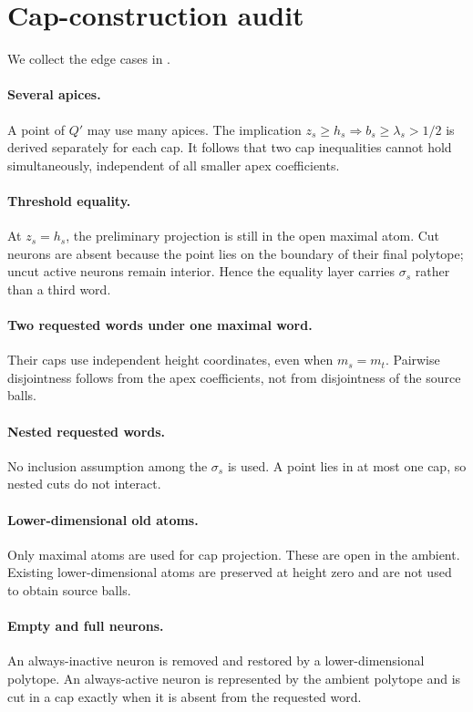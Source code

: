 \section{Cap-construction audit}
\label{app:cap-audit}

We collect the edge cases in .

\paragraph{Several apices.}
A point of $Q'$ may use many apices.  The implication $z_s\ge h_s\Rightarrow b_s\ge\lambda_s>1/2$ is derived separately for each cap.  It follows that two cap inequalities cannot hold simultaneously, independent of all smaller apex coefficients.

\paragraph{Threshold equality.}
At $z_s=h_s$, the preliminary projection is still in the open maximal atom.  Cut neurons are absent because the point lies on the boundary of their final polytope; uncut active neurons remain interior.  Hence the equality layer carries $\sigma_s$ rather than a third word.

\paragraph{Two requested words under one maximal word.}
Their caps use independent height coordinates, even when $m_s=m_t$.  Pairwise disjointness follows from the apex coefficients, not from disjointness of the source balls.

\paragraph{Nested requested words.}
No inclusion assumption among the $\sigma_s$ is used.  A point lies in at most one cap, so nested cuts do not interact.

\paragraph{Lower-dimensional old atoms.}
Only maximal atoms are used for cap projection.  These are open in the ambient.  Existing lower-dimensional atoms are preserved at height zero and are not used to obtain source balls.

\paragraph{Empty and full neurons.}
An always-inactive neuron is removed and restored by a lower-dimensional polytope.  An always-active neuron is represented by the ambient polytope and is cut in a cap exactly when it is absent from the requested word.

